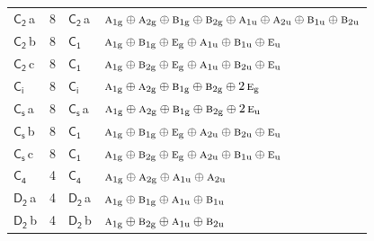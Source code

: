 \documentclass[10pt,a4paper]{article}
\numberwithin{equation}{section}
\newcommand{\grp}[1]{\mathsf{#1}}
\newcommand{\irr}[1]{\text{\normalfont\scshape #1}}
\newcommand{\ptag}[1]{\mathrm{#1}}
\newcommand{\clsletter}[1]{\,{\scriptsize\color{black!55}#1}}
\newlength{\fillwidth}\newlength{\cellwidth}\newlength{\colwidth}
\begin{document}
{\begin{longtable}{@{}lrl>{\RaggedRight\arraybackslash}p{\fillwidth}@{}}
\href{C2.pdf}{$\grp{C_{2}}$}\clsletter{a} & 8 & \href{C2.pdf}{$\grp{C_{2}}$}\clsletter{a} & $\irr{a}_{1\ptag{g}}\oplus \irr{a}_{2\ptag{g}}\oplus \irr{b}_{1\ptag{g}}\oplus \irr{b}_{2\ptag{g}}\oplus \irr{a}_{1\ptag{u}}\oplus \irr{a}_{2\ptag{u}}\oplus \irr{b}_{1\ptag{u}}\oplus \irr{b}_{2\ptag{u}}$\\
\href{C2.pdf}{$\grp{C_{2}}$}\clsletter{b} & 8 & \href{C1.pdf}{$\grp{C_{1}}$} & $\irr{a}_{1\ptag{g}}\oplus \irr{b}_{1\ptag{g}}\oplus \irr{e}_{\ptag{g}}\oplus \irr{a}_{1\ptag{u}}\oplus \irr{b}_{1\ptag{u}}\oplus \irr{e}_{\ptag{u}}$\\
\href{C2.pdf}{$\grp{C_{2}}$}\clsletter{c} & 8 & \href{C1.pdf}{$\grp{C_{1}}$} & $\irr{a}_{1\ptag{g}}\oplus \irr{b}_{2\ptag{g}}\oplus \irr{e}_{\ptag{g}}\oplus \irr{a}_{1\ptag{u}}\oplus \irr{b}_{2\ptag{u}}\oplus \irr{e}_{\ptag{u}}$\\
\href{S2.pdf}{$\grp{C_{i}}$} & 8 & \href{S2.pdf}{$\grp{C_{i}}$} & $\irr{a}_{1\ptag{g}}\oplus \irr{a}_{2\ptag{g}}\oplus \irr{b}_{1\ptag{g}}\oplus \irr{b}_{2\ptag{g}}\oplus 2\,\irr{e}_{\ptag{g}}$\\
\href{C1v.pdf}{$\grp{C_{s}}$}\clsletter{a} & 8 & \href{C1v.pdf}{$\grp{C_{s}}$}\clsletter{a} & $\irr{a}_{1\ptag{g}}\oplus \irr{a}_{2\ptag{g}}\oplus \irr{b}_{1\ptag{g}}\oplus \irr{b}_{2\ptag{g}}\oplus 2\,\irr{e}_{\ptag{u}}$\\
\href{C1v.pdf}{$\grp{C_{s}}$}\clsletter{b} & 8 & \href{C1.pdf}{$\grp{C_{1}}$} & $\irr{a}_{1\ptag{g}}\oplus \irr{b}_{1\ptag{g}}\oplus \irr{e}_{\ptag{g}}\oplus \irr{a}_{2\ptag{u}}\oplus \irr{b}_{2\ptag{u}}\oplus \irr{e}_{\ptag{u}}$\\
\href{C1v.pdf}{$\grp{C_{s}}$}\clsletter{c} & 8 & \href{C1.pdf}{$\grp{C_{1}}$} & $\irr{a}_{1\ptag{g}}\oplus \irr{b}_{2\ptag{g}}\oplus \irr{e}_{\ptag{g}}\oplus \irr{a}_{2\ptag{u}}\oplus \irr{b}_{1\ptag{u}}\oplus \irr{e}_{\ptag{u}}$\\
\href{C4.pdf}{$\grp{C_{4}}$} & 4 & \href{C4.pdf}{$\grp{C_{4}}$} & $\irr{a}_{1\ptag{g}}\oplus \irr{a}_{2\ptag{g}}\oplus \irr{a}_{1\ptag{u}}\oplus \irr{a}_{2\ptag{u}}$\\
\href{D2.pdf}{$\grp{D_{2}}$}\clsletter{a} & 4 & \href{D2.pdf}{$\grp{D_{2}}$}\clsletter{a} & $\irr{a}_{1\ptag{g}}\oplus \irr{b}_{1\ptag{g}}\oplus \irr{a}_{1\ptag{u}}\oplus \irr{b}_{1\ptag{u}}$\\
\href{D2.pdf}{$\grp{D_{2}}$}\clsletter{b} & 4 & \href{D2.pdf}{$\grp{D_{2}}$}\clsletter{b} & $\irr{a}_{1\ptag{g}}\oplus \irr{b}_{2\ptag{g}}\oplus \irr{a}_{1\ptag{u}}\oplus \irr{b}_{2\ptag{u}}$\\

\end{longtable}}
\end{document}
